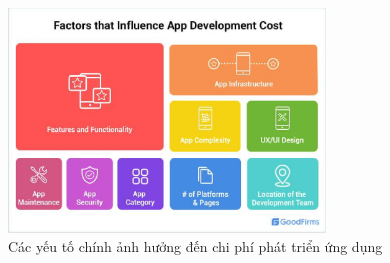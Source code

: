 \begin{figure}[H]
  \centering
  \includegraphics[width=0.75\textwidth]{images/appCosst.png}
  \caption{Các yếu tố chính ảnh hưởng đến chi phí phát triển ứng dụng}
  \label{fig:fig20}
\end{figure}
